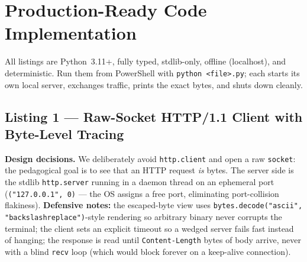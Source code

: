 \section{Production-Ready Code Implementation}

All listings are Python~3.11+, fully typed, stdlib-only, offline (localhost), and deterministic. Run them from PowerShell with \texttt{python <file>.py}; each starts its own local server, exchanges traffic, prints the exact bytes, and shuts down cleanly.

\subsection{Listing 1 --- Raw-Socket HTTP/1.1 Client with Byte-Level Tracing}

\textbf{Design decisions.} We deliberately avoid \texttt{http.client} and open a raw \texttt{socket}: the pedagogical goal is to see that an HTTP request \emph{is} bytes. The server side is the stdlib \texttt{http.server} running in a daemon thread on an ephemeral port (\texttt{("127.0.0.1", 0)} --- the OS assigns a free port, eliminating port-collision flakiness). \textbf{Defensive notes:} the escaped-byte view uses \texttt{bytes.decode("ascii", "backslashreplace")}-style rendering so arbitrary binary never corrupts the terminal; the client sets an explicit timeout so a wedged server fails fast instead of hanging; the response is read until \texttt{Content-Length} bytes of body arrive, never with a blind \texttt{recv} loop (which would block forever on a keep-alive connection).

